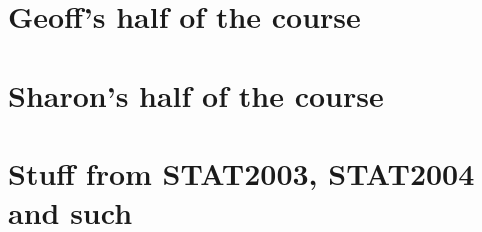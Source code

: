\documentclass[a4paper,12pt]{report}
\begin{document}

\part{Geoff's half of the course}


\part{Sharon's half of the course}

\part{Stuff from STAT2003, STAT2004 and such}

\end{document}
